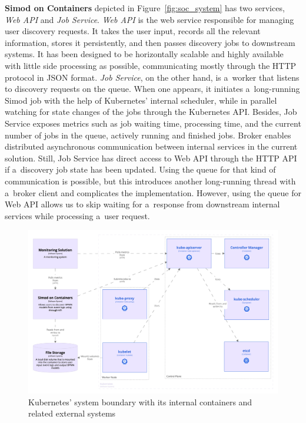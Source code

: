 \documentclass[12pt]{article}
\begin{document}
\textbf{Simod on Containers} depicted in Figure~\ref{fig:soc_system} has two services, \emph{Web API} and \emph{Job Service}. \emph{Web API} is the web service responsible for managing user discovery requests. It takes the user input, records all the relevant information, stores it persistently, and then passes discovery jobs to downstream systems. It has been designed to be horizontally scalable and highly available with little side processing as possible, communicating mostly through the HTTP protocol in JSON format. \emph{Job Service}, on the other hand, is a~worker that listens to discovery requests on the queue. When one appears, it initiates a~long-running Simod job with the help of Kubernetes' internal scheduler, while in parallel watching for state changes of the jobs through the Kubernetes API. Besides, Job Service exposes metrics such as job waiting time, processing time, and the current number of jobs in the queue, actively running and finished jobs. Broker enables distributed asynchronous communication between internal services in the current solution. Still, Job Service has direct access to Web API through the HTTP API if a~discovery job state has been updated. Using the queue for that kind of communication is possible, but this introduces another long-running thread with a~broker client and complicates the implementation. However, using the queue for Web API allows us to skip waiting for a~response from downstream internal services while processing a~user request. 

\begin{figure}[t]
    \centering
    \includegraphics[width=\textwidth]{figures/structurizr-1-KubernetesContainer.png}
    \caption{Kubernetes' system boundary with its internal containers and related external systems}
    \label{fig:kubernetes_system}
\end{figure}
\end{document}

